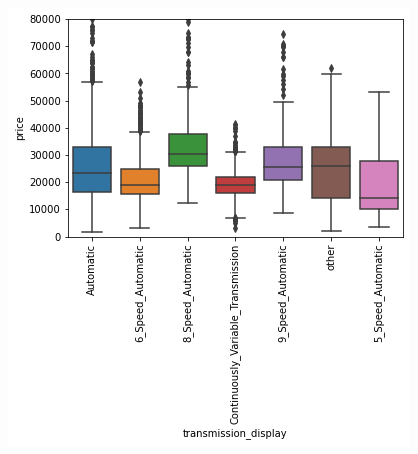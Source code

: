 \documentclass[
  letterpaper,
  DIV=11,
  numbers=noendperiod]{scrartcl}
\begin{document}
\includegraphics{Final Project Report - Used Cars Regression_files/figure-pdf/cell-8-output-3.png}
\end{document}
